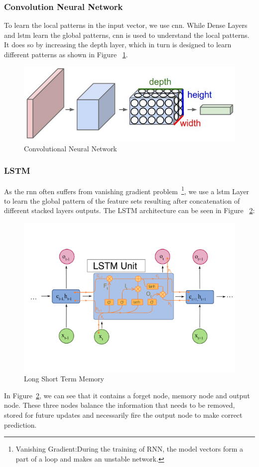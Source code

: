 \subsubsection{Convolution Neural Network}
To learn the local patterns in the input vector, we use \acrshort{cnn}. While Dense Layers and \acrshort{lstm} learn the global patterns, \acrshort{cnn} is used to understand the local patterns. It does so by increasing the depth layer, which in turn is designed to learn different patterns as shown in Figure ~\ref{fig:cnn}.
\begin{figure}[ht]
  \centering
  \includegraphics[width=.5\linewidth]{mainmatter/3-Methodology/images/cnn.jpg}
  \caption{Convolutional Neural Network}
  \label{fig:cnn}
\end{figure}

\subsubsection{LSTM}
As the \acrfull{rnn} often suffers from vanishing gradient problem~\footnote{Vanishing Gradient:During the training of RNN, the model vectors form a part of a loop and makes an unstable network.}, we use a \acrshort{lstm} Layer to learn the global pattern of the feature sets resulting after concatenation of different stacked layers outputs. The LSTM architecture can be seen in Figure ~\ref{fig:lstm}:
\begin{figure}
  [ht]
  \centering
  \includegraphics[width=.5\linewidth]{mainmatter/3-Methodology/images/LSTM.pdf}
  \caption{Long Short Term Memory}
  \label{fig:lstm}
\end{figure}
In Figure~\ref{fig:lstm}, we can see that it contains a forget node, memory node and output node. These three nodes balance the information that needs to be removed, stored for future updates and necessarily fire the output node to make correct prediction.



